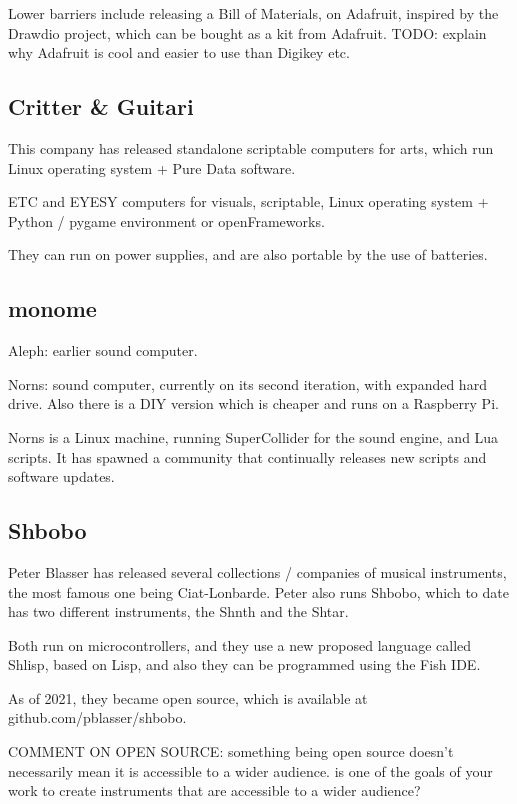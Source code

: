 Lower barriers include releasing a Bill of Materials, on Adafruit, inspired by the Drawdio project, which can be bought as a kit from Adafruit. TODO: explain why Adafruit is cool and easier to use than Digikey etc.

\subsection{Critter \& Guitari}

This company has released standalone scriptable computers for arts, which run Linux operating system + Pure Data software.

ETC and EYESY computers for visuals, scriptable, Linux operating system + Python / pygame environment or openFrameworks.

They can run on power supplies, and are also portable by the use of batteries.

\subsection{monome}

Aleph: earlier sound computer.

Norns: sound computer, currently on its second iteration, with expanded hard drive. Also there is a DIY version which is cheaper and runs on a Raspberry Pi.

Norns is a Linux machine, running SuperCollider for the sound engine, and Lua scripts. It has spawned a community that continually releases new scripts and software updates.

\subsection{Shbobo}

Peter Blasser has released several collections / companies of musical instruments, the most famous one being Ciat-Lonbarde. Peter also runs Shbobo, which to date has two different instruments, the Shnth and the Shtar.

Both run on microcontrollers, and they use a new proposed language called Shlisp, based on Lisp, and also they can be programmed using the Fish IDE.

As of 2021, they became open source, which is available at github.com/pblasser/shbobo.

COMMENT ON OPEN SOURCE: something being open source doesn't necessarily mean it is accessible to a wider audience. is one of the goals of your work to create instruments that are accessible to a wider audience?


